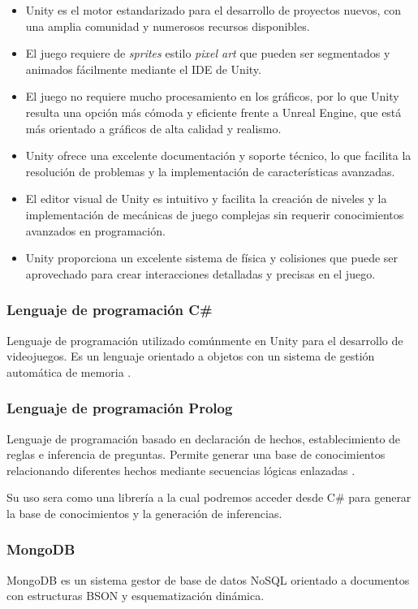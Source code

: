 \documentclass[12pt,twoside]{article}
\begin{document}
\begin{itemize}
	\item Unity es el motor estandarizado para el desarrollo de proyectos nuevos, con una amplia comunidad y numerosos recursos disponibles.
	\item El juego requiere de \textit{sprites} estilo \textit{pixel art} que pueden ser segmentados y animados fácilmente mediante el IDE de Unity.
	\item El juego no requiere mucho procesamiento en los gráficos, por lo que Unity resulta una opción más cómoda y eficiente frente a Unreal Engine, que está más orientado a gráficos de alta calidad y realismo.
	\item Unity ofrece una excelente documentación y soporte técnico, lo que facilita la resolución de problemas y la implementación de características avanzadas.
	\item El editor visual de Unity es intuitivo y facilita la creación de niveles y la implementación de mecánicas de juego complejas sin requerir conocimientos avanzados en programación.
	\item Unity proporciona un excelente sistema de física y colisiones que puede ser aprovechado para crear interacciones detalladas y precisas en el juego.
\end{itemize}

	\subsubsection{Lenguaje de programación C\#}
	Lenguaje de programación utilizado comúnmente en Unity para el desarrollo de videojuegos. Es un lenguaje orientado a objetos con un sistema de gestión automática de memoria  \cite{lan: c_sharp}.
	
	\subsubsection{Lenguaje de programación Prolog}
	Lenguaje de programación basado en declaración de hechos, establecimiento de reglas e inferencia de preguntas. Permite generar una base de conocimientos relacionando diferentes hechos  mediante secuencias lógicas enlazadas \cite{lan: prolog}.
	
	Su uso sera como una librería a la cual podremos acceder desde C\# para generar la base de conocimientos y la generación de inferencias. 
	
	\subsubsection{MongoDB}
	MongoDB es un sistema gestor de base de datos NoSQL orientado a documentos con estructuras BSON y esquematización dinámica.
\end{document}
